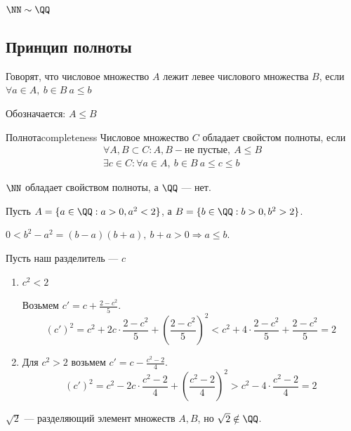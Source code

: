 \begin{thrm}{}{}
    \( \NN \sim \QQ \)
\end{thrm}

\subsection{Принцип полноты}

\begin{defn}{}{}
    Говорят, что числовое множество \( A \) лежит левее числового множества \( B \), если
    \( \forall a \in A, \ b \in B \: a \leq b \)

    Обозначается: \( A \leq B \)
\end{defn}

\begin{defn}{Полнота}{completeness}
    Числовое множество \( C \) обладает свойстом полноты, если
    \begin{gather*}
        \forall A, B \subset C : A, B - \text{не пустые}, \ A \leq B
        \\
        \exists c \in C : \forall a \in A, \ b \in B \ a \leq c \leq b
    \end{gather*}
\end{defn}

\( \NN \) обладает свойством полноты, а \( \QQ \) --- нет.

Пусть \( A = \{ a \in \QQ : a > 0, a^2 < 2 \} \), а \( B = \{ b \in \QQ : b > 0, b^2 > 2 \} \).

\( 0 < b^2 - a^2 = (b - a)(b + a), \ b + a > 0 \Rightarrow a \leq b \).

Пусть наш разделитель --- \( c \)
\begin{enumerate}
    \item
        \( c^2 < 2 \)

        Возьмем \( c' = c + \frac{2 - c^2}{5} \).
        \[
            (c')^2 = c^2 + 2 c \cdot \frac{2 - c^2}{5} + \left( \frac{2 - c^2}{5} \right)^2
            < c^2 + 4 \cdot \frac{2 - c^2}{5} + \frac{2 - c^2}{5} = 2
        \]
    \item
        Для \( c^2 > 2 \) возьмем \( c' = c - \frac{c^2 - 2}{4} \).
        \[
            (c')^2 = c^2 - 2 c \cdot \frac{c^2 - 2}{4} + \left( \frac{c^2 - 2}{4} \right)^2
            > c^2 - 4 \cdot \frac{c^2 - 2}{4} = 2
        \]
\end{enumerate}

\( \sqrt{2} \) --- разделяющий элемент множеств \( A, B \), но \( \sqrt{2} \notin \QQ \).
